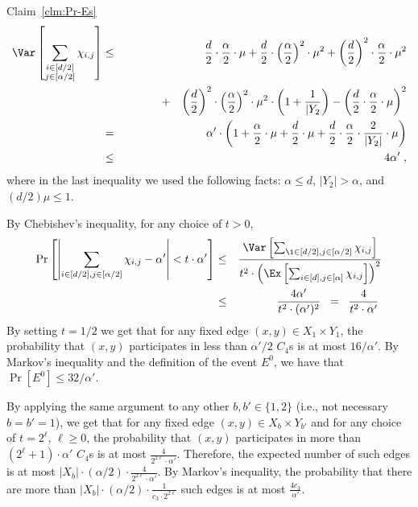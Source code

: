 \begin{proofof}{Claim~\ref{clm:Pr-Es}}
\begin{eqnarray}
\Var\left[\sum_{\substack{i\in [d/2] \\ j\in [\alpha/2]}}\chi_{i,j}\right]
&\leq& \frac{d}{2}\cdot\frac{\alpha}{2}\cdot\mu
+ \frac{d}{2}\cdot \left(\frac{\alpha}{2}\right)^2 \cdot \mu^2 + \left(\frac{d}{2}\right)^2\cdot \frac{\alpha}{2}\cdot \mu^2 \nonumber \\
&\;\;\;\;\;\;\;\;\;\;\;\;\;\;\;\;\;\;\;+& \left(\frac{d}{2}\right)^2\cdot \left(\frac{\alpha}{2}\right)^2 \cdot \mu^2\cdot \left(1+\frac{1}{|Y_2}\right) - \left(\frac{d}{2}\cdot\frac{\alpha}{2}\cdot \mu\right)^2 \nonumber \\
&=& \alpha'\cdot
\left( 1+ \frac{\alpha}{2}\cdot\mu + \frac{d}{2}\cdot \mu + \frac{d}{2}\cdot \frac{\alpha}{2}\cdot \frac{2}{|Y_2|}\cdot \mu\right)\nonumber \\
&\leq& 4\alpha' \;,
\end{eqnarray}
where in the last inequality we used the following facts: $\alpha \leq d$, $|Y_2|> \alpha$, and
$(d/2)\mu \leq 1$.

By Chebishev's inequality,
for any choice of $t>0$,
\begin{eqnarray}
\Pr\left[\left|\sum_{i\in [d/2],j\in [\alpha/2]}\chi_{i,j} - \alpha'\right|< t\cdot \alpha' \right] &\leq& \frac{\Var\left[\sum_{\i\in [d/2],j\in [\alpha/2]}\chi_{i,j}\right]}{t^2\cdot \left(\Ex\left[\sum_{i\in [d],j\in [\alpha]} \chi_{i,j}\right]\right)^2} \\
&\leq& \frac{4\alpha'}{t^2 \cdot (\alpha')^2}
\;\;= \;\;\frac{4}{t^2\cdot \alpha'}\;
\label{eq:C4-lb-cheb2}
\end{eqnarray}
By setting $t=1/2$ we get that for any fixed edge $(x,y)\in X_1\times Y_1$, the probability that $(x,y)$ participates in less than $\alpha'/2$ $C_4$s is at most $16/\alpha'$. By Markov's inequality and the definition of the event $E^0$, we have that
$\Pr[E^0] \leq 32/\alpha'$.

By applying the same argument to any other $b,b' \in \{1,2\}$ (i.e., not necessary $b=b'=1$), we get that
for any fixed edge $(x,y)\in X_b\times Y_{b'}$ and for
any choice of $t = 2^{\ell}$, $\ell \geq 0$,
 the probability that $(x,y)$ participates in more  than $(2^\ell +1)\cdot \alpha'$ $C_4$s is at most $\frac{4}{2^{2\ell}\cdot \alpha'}$.
Therefore, the expected number of such edges is at most
$|X_b|\cdot (\alpha/2)\cdot \frac{4}{2^{2\ell}\cdot \alpha'}$. By Markov's inequality, the probability that there are more than
$ |X_b|\cdot (\alpha/2)\cdot \frac{1}{c_3\cdot 2^{2\ell}}$ such edges is at most $\frac{4c_3}{\alpha'}$.


\end{proofof}
